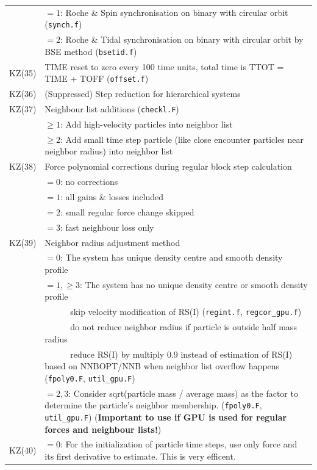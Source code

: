 \begin{longtable}{@{}p{1.5cm}p{13.0cm}}
        & $=1$: Roche \& Spin synchronisation on binary with circular orbit (\texttt{synch.f}) \\
        & $=2$: Roche \& Tidal synchronisation on binary with circular orbit by BSE method (\texttt{bsetid.f}) \\
KZ(35)  & TIME reset to zero every 100 time units, total time is TTOT = TIME + TOFF (\texttt{offset.f})\\
KZ(36)  & (Suppressed) Step reduction for hierarchical systems \\
KZ(37)  & Neighbour list additions (\texttt{checkl.F}) \\
        & $\ge 1$: Add high-velocity particles into neighbor list \\
        & $\ge 2$: Add small time step particle (like close encounter particles near neighbor radius) into neighbor list \\
KZ(38)  & Force polynomial corrections during regular block step calculation \\
        & $=0$: no corrections \\
        & $=1$: all gains \& losses included \\
        & $=2$: small regular force change skipped \\
        & $=3$: fast neighbour loss only \\
KZ(39)  & Neighbor radius adjustment method \\
        & $=0$: The system has unique density centre and smooth density profile\\
        & $=1,\ge 3$: The system has no unique density centre or smooth density profile\\
        & ~~~~~~skip velocity modification of RS(I) (\texttt{regint.f}, \texttt{regcor\_gpu.f}) \\
        & ~~~~~~do not reduce neighbor radius if particle is outside half mass radius \\
        & ~~~~~~reduce RS(I) by multiply $0.9$ instead of estimation of RS(I) based on NNBOPT/NNB when neighbor list overflow happens (\texttt{fpoly0.F}, \texttt{util\_gpu.F}) \\
        & $=2,3$: Consider sqrt(particle mass / average mass) as the factor to determine the particle's neighbor membership. (\texttt{fpoly0.F}, \texttt{util\_gpu.F}) ({\bf Important to use if GPU is used for regular forces and neighbour lists!}) \\
KZ(40)  & $=0$: For the initialization of particle time steps, use only force and its first derivative to estimate. This is very efficent.\\

\end{longtable}
